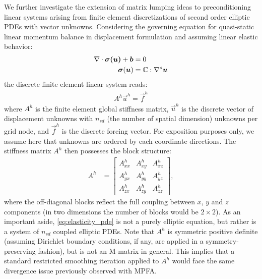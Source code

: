 We further investigate the extension of matrix lumping ideas to preconditioning linear systems arising from finite element discretizations of second order elliptic PDEs with vector unknowns.   Considering the governing equation for quasi-static linear momentum balance in displacement formulation and assuming linear elastic behavior:
\begin{align}
    \nabla \cdot \bm{\sigma(\bm{u})} + \bm{b} &= 0 \\
    \bm{\sigma}(\bm{u}) &= \mathbb{C} : \nabla^s \bm{u}
    \label{eq:elasticity_pde}
\end{align}
the discrete finite element linear system reads:
\begin{align}
    A^h\vec{u}^h = \vec{f}^h
\end{align}
where $A^h$ is the finite element global stiffness matrix, $\vec{u}^h$ is the discrete vector of displacement unknowns with $n_{sd}$ (the number of spatial dimension) unknowns per grid node, and $\vec{f}^h$ is the discrete forcing vector.   For exposition purposes only, we assume here that unknowns are ordered by each coordinate directions.   The stiffness matrix $A^h$ then possesses the block structure:
\begin{align}
	A^h &=
    \begin{bmatrix}
        A_{xx}^h & A_{xy}^h & A_{xz}^h \\
        A_{yx}^h & A_{yy}^h & A_{yz}^h \\
        A_{zx}^h & A_{zy}^h & A_{zz}^h 
	\end{bmatrix},
	\label{eq:blk_stiff}
\end{align}
where the off-diagonal blocks reflect the full coupling between $x$, $y$ and $z$ components (in two dimensions the number of blocks would be $2 \times 2$).   As an important aside, \eqref{eq:elasticity_pde} is not a purely elliptic equation, but rather is a system of $n_{sd}$ coupled elliptic PDEs.   Note that $A^h$ is symmetric positive definite (assuming Dirichlet boundary conditions, if any, are applied in a symmetry-preserving fashion), but is not an M-matrix in general.   This implies that a standard restricted smoothing iteration applied to $A^h$ would face the same divergence issue previously observed with MPFA.

